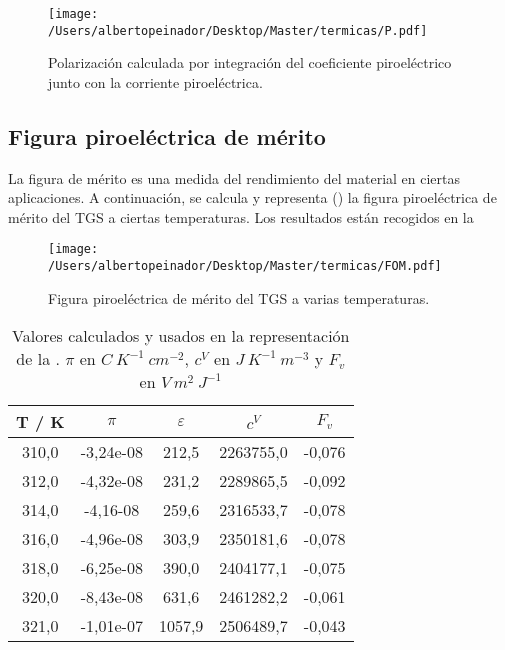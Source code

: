\documentclass[a4paper, 12pt, spanish]{article}
\begin{document}
\begin{multicols}{2}
\begin{figure}[H]
    \centering
    \texttt{[image: /Users/albertopeinador/Desktop/Master/termicas/P.pdf]}
    \caption{Polarización calculada por integración del coeficiente piroeléctrico junto con la corriente piroeléctrica.}\label{fig:pol}
\end{figure}
\subsection*{Figura piroeléctrica de mérito}
La figura de mérito es una medida del rendimiento del material en ciertas aplicaciones. A continuación, se calcula y representa () la figura piroeléctrica de mérito del TGS a ciertas temperaturas. Los resultados están recogidos en la 

\begin{figure}[H]
    \centering
    \texttt{[image: /Users/albertopeinador/Desktop/Master/termicas/FOM.pdf]}
    \caption{Figura piroeléctrica de mérito del TGS a varias temperaturas.}\label{fig:FOM}
\end{figure}
\begin{table}[H]
    \centering
    \caption{Valores calculados y usados en la representación de la . $\pi$ en $C\ K^{-1}\ cm^{-2}$, $c^V$ en $J\ K^{-1}\ m^{-3}$ y $F_v$ en $V\ m^2\ J^{-1}$}\label{tab:FOM}
\begin{tabular}{ccccc}
    \toprule
       T / K &         $\pi$ &  $\varepsilon$ &      $c^V$ &     $F_v$ \\\midrule
  310,0 & -3,24e-08 &    212,5 &  2263755,0 & -0,076 \\
  312,0 & -4,32e-08 &    231,2 &  2289865,5 & -0,092 \\
  314,0 & -4,16-08 &    259,6 &  2316533,7 & -0,078 \\
  316,0 & -4,96e-08 &    303,9 &  2350181,6 & -0,078 \\
  318,0 & -6,25e-08 &    390,0 &  2404177,1 & -0,075 \\
  320,0 & -8,43e-08 &    631,6 &  2461282,2 & -0,061 \\
  321,0 & -1,01e-07 &   1057,9 &  2506489,7 & -0,043\\
    \bottomrule
    \end{tabular}
\end{table}



\end{multicols}
\end{document}
